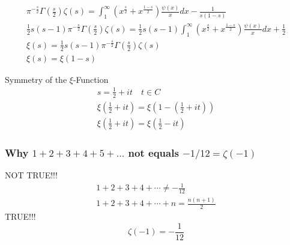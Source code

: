 	$$
	\begin{gathered}
		\pi^{-\frac{s}{2}} \Gamma\left(\frac{s}{2}\right) \zeta(s)=\int_1^{\infty}\left(x^{\frac{s}{2}}+x^{\frac{1-s}{2}}\right) \frac{\psi(x)}{x} d x-\frac{1}{s(1-s)} \\
		\frac{1}{2} s(s-1) \pi^{-\frac{s}{2}} \Gamma\left(\frac{s}{2}\right) \zeta(s)=\frac{1}{2} s(s-1) \int_1^{\infty}\left(x^{\frac{s}{2}}+x^{\frac{1-s}{2}}\right) \frac{\psi(x)}{x} d x+\frac{1}{2} \\
		\xi(s)=\frac{1}{2} s(s-1) \pi^{-\frac{s}{2}} \Gamma\left(\frac{s}{2}\right) \zeta(s) \\
		\xi(s)=\xi(1-s)
	\end{gathered}
	$$
	
	Symmetry of the $\xi$-Function
	$$
	\begin{gathered}
		s=\frac{1}{2}+i t \quad t \in C \\
		\xi\left(\frac{1}{2}+i t\right)=\xi\left(1-\left(\frac{1}{2}+i t\right)\right) \\
		\xi\left(\frac{1}{2}+i t\right)=\xi\left(\frac{1}{2}-i t\right)
	\end{gathered}
	$$
	
	\subsubsection{Why $1+2+3+4+5+...$ not equals $-1/12 = \zeta(-1)$}
	
	NOT TRUE!!!
	$$
	\begin{array}{r}
		1+2+3+4+\cdots \neq-\frac{1}{12} \\
		1+2+3+4+\cdots+n=\frac{n(n+1)}{2}
	\end{array}
	$$
	TRUE!!!
	$$
	\zeta(-1)=-\frac{1}{12}
	$$
	
